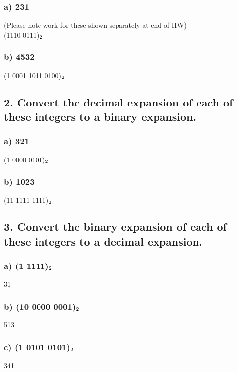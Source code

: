 \documentclass[11pt, oneside]{article} %
\numberwithin{equation}{section} %
\numberwithin{figure}{section} %
\numberwithin{table}{section} %
\begin{document}
\subsubsection{a) 231}
(Please note work for these shown separately at end of HW) \\
(1110 0111)$\textsubscript{2}$ \\
\subsubsection{b) 4532}
(1 0001 1011 0100)$\textsubscript{2}$


\subsection{2. Convert the decimal expansion of each of these integers to a binary expansion.}
\subsubsection{a) 321}
(1 0000 0101)$\textsubscript{2}$
\subsubsection{b) 1023}
(11 1111 1111)$\textsubscript{2}$


\subsection{3. Convert the binary expansion of each of these integers to a decimal expansion.}
\subsubsection{a) (1 1111)$\textsubscript{2}$}
31
\subsubsection{b) (10 0000 0001)$\textsubscript{2}$}
513
\subsubsection{c) (1 0101 0101)$\textsubscript{2}$}
341
\end{document}
